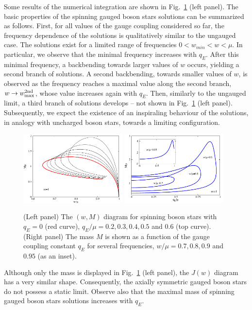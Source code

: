 Some results of the numerical integration are shown in Fig.~\ref{fig:w-M-gauged} (left panel).
The basic properties of the spinning gauged boson stars solutions can be summarized as follows.
First, for all values of the gauge coupling considered so far, 
the frequency dependence of the solutions is qualitatively similar to the ungauged case.
The solutions 
exist for a limited range of frequencies
$0<w_{min}<w<\mu$. 
In particular, we observe that the minimal frequency increases with $q_E$. 
After this minimal frequency, a backbending towards larger values of $w$ occurs, yielding a second branch of solutions. 
A second backbending, towards
smaller values of $w$,  is observed as the frequency reaches a maximal value along the second branch, $w\to w^{\rm 2nd}_{\rm max}$, whose value increases again with $q_E$. 
Then, similarly to the ungauged limit, a third branch of solutions develops -- not shown in Fig.~\ref{fig:w-M-gauged} (left panel).
Subsequently, we expect the existence of an inspiraling behaviour of the solutions, 
in analogy with uncharged boson stars, towards a limiting configuration.  


\begin{figure}[H]
  \begin{center}
    \includegraphics[width=0.48\textwidth]{papers/KerrNewman/BS-w-M-gauged}
    \includegraphics[width=0.48\textwidth]{papers/KerrNewman/BS-g-M-gauged}
  \end{center}
  \caption{
	(Left panel)
	The $(w,M)$ diagram for spinning boson stars with $q_E=0$ (red curve), $q_E/\mu=0.2, 0.3, 0.4, 0.5$
	and $0.6$ (top curve).  
		(Right panel)
	The mass $M$ is shown as a function of the gauge coupling constant $q_E$
	for several frequencies, $w/\mu=0.7, 0.8, 0.9$ and $0.95$ (as an inset).	}
  \label{fig:w-M-gauged}
\end{figure}
Although only the mass is displayed in Fig.~\ref{fig:w-M-gauged} (left panel), the $J(w)$
diagram has a very similar shape.
Consequently,  the axially symmetric gauged boson stars do not possess
a static limit.  Observe also that the maximal mass of spinning gauged boson stars solutions increases with $q_E$.

